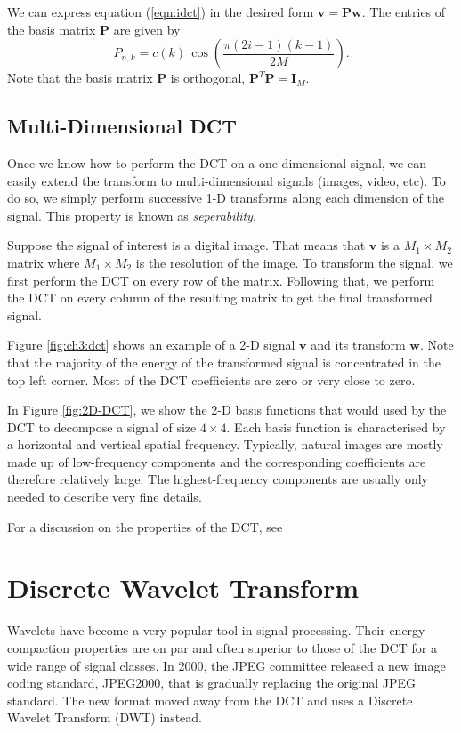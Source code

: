 We can express equation (\ref{eqn:idct}) in the desired form $\bm v=\bm P\bm w$.
The entries of the basis matrix $\bm P$ are given by
\begin{equation}
  \label{eqn:idct_basis}
  P_{n,k} = c(k)\, \cos\left(\frac{\pi(2i-1)(k-1)}{2M}\right).
\end{equation}
Note that the basis matrix $\bm P$ is orthogonal, $\bm P^T\bm P=\bm I_M$.

\subsection{Multi-Dimensional DCT}
Once we know how to perform the DCT on a one-dimensional signal, we can easily extend the transform to multi-dimensional signals (images, video, etc).
To do so, we simply perform successive 1-D transforms along each dimension of the signal.
This property is known as \emph{seperability}.

Suppose the signal of interest is a digital image.
That means that $\bm v$ is a $M_1\times M_2$ matrix where $M_1\times M_2$ is the resolution of the image.
To transform the signal, we first perform the DCT on every row of the matrix.
Following that, we perform the DCT on every column of the resulting matrix to get the final transformed signal.

Figure \ref{fig:ch3:dct} shows an example of a 2-D signal $\bm v$ and its transform $\bm w$.
Note that the majority of the energy of the transformed signal is concentrated in the top left corner.
Most of the DCT coefficients are zero or very close to zero.

In Figure \ref{fig:2D-DCT}, we show the 2-D basis functions that would used by the DCT to decompose a signal of size $4\times 4$.
Each basis function is characterised by a horizontal and vertical spatial frequency.
Typically, natural images are mostly made up of low-frequency components and the corresponding coefficients are therefore relatively large.
The highest-frequency components are usually only needed to describe very fine details.

For a discussion on the properties of the DCT, see \cite{khayam2003}

\section{Discrete Wavelet Transform}
Wavelets have become a very popular tool in signal processing.
Their energy compaction properties are on par and often superior to those of the DCT for a wide range of signal classes.
In 2000, the JPEG committee released a new image coding standard, JPEG2000, that is gradually replacing the original JPEG standard.
The new format moved away from the DCT and uses a Discrete Wavelet Transform (DWT) instead.

